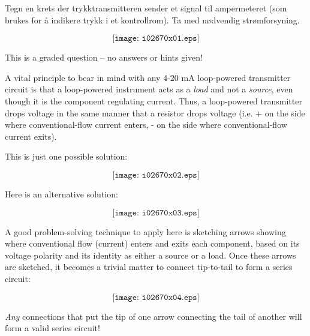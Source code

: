 


Tegn en krets der trykktransmitteren sender et signal til ampermeteret (som brukes for å indikere trykk i et kontrollrom). Ta med nødvendig strømforsyning. 

\vskip 50pt

$$\texttt{[image: i02670x01.eps]}$$

\vfil 

\eject






This is a graded question -- no answers or hints given!







A vital principle to bear in mind with any 4-20 mA loop-powered transmitter circuit is that a loop-powered instrument acts as a {\it load} and not a {\it source}, even though it is the component regulating current.  Thus, a loop-powered transmitter drops voltage in the same manner that a resistor drops voltage (i.e. + on the side where conventional-flow current enters, - on the side where conventional-flow current exits).

\vskip 10pt

This is just one possible solution:

$$\texttt{[image: i02670x02.eps]}$$

\vskip 10pt

Here is an alternative solution:

$$\texttt{[image: i02670x03.eps]}$$

\filbreak

A good problem-solving technique to apply here is sketching arrows showing where conventional flow (current) enters and exits each component, based on its voltage polarity and its identity as either a source or a load.  Once these arrows are sketched, it becomes a trivial matter to connect tip-to-tail to form a series circuit:

$$\texttt{[image: i02670x04.eps]}$$

{\it Any} connections that put the tip of one arrow connecting the tail of another will form a valid series circuit!





